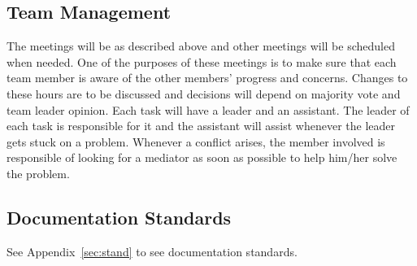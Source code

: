 \subsection{Team Management}

The meetings will be as described above and other meetings will be scheduled
when needed. One of the purposes of these meetings is to make sure that each
team member is aware of the other members' progress and concerns. Changes to
these hours are to be discussed and decisions will depend on majority vote and
team leader opinion. Each task will have a leader and an assistant. The leader
of each task is responsible for it and the assistant will assist whenever the
leader gets stuck on a problem. Whenever a conflict arises, the member involved
is responsible of looking for a mediator as soon as possible to help him/her
solve the problem.

\subsection{Documentation Standards}
See Appendix~\ref{sec:stand} to see documentation standards.

